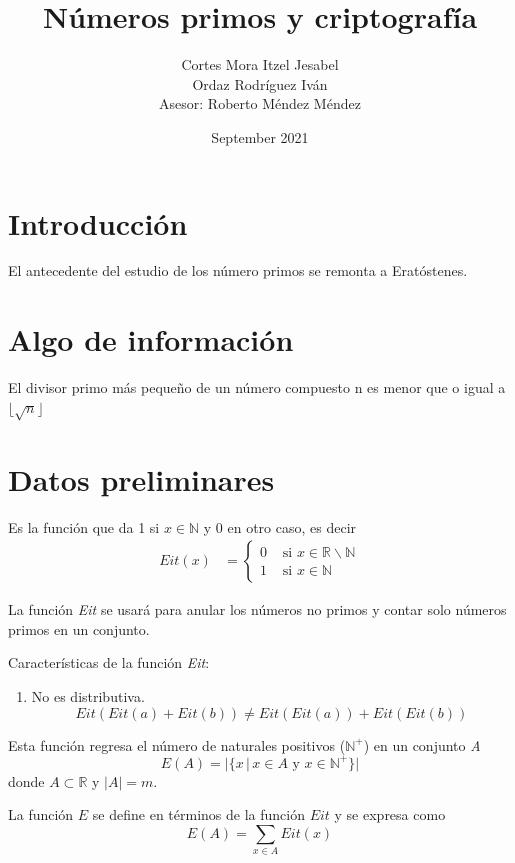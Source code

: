 \documentclass[10pt,letterpaper]{article}
\title{Números primos y criptografía}
\author{Cortes Mora Itzel Jesabel   \\Ordaz Rodríguez Iván \\ Asesor: Roberto Méndez Méndez}
\date{September 2021}
\begin{document}
	
	\maketitle
	\section*{Introducción}
	El antecedente del estudio de los número primos  se remonta a  Eratóstenes.
	
	
	
	\section{Algo de información}
	
	\begin{teoremaf2}
		El divisor primo más pequeño de un número compuesto n es menor que o igual a $\lfloor \sqrt{n} \rfloor$ 
		
	\end{teoremaf2}
	
	
	\section{Datos preliminares}
	\begin{definicionf2}
		Es la función que da 1 si $x \in \mathbb{N}$ y 0 en otro caso, es decir
		\begin{align}
			Eit(x)&=\begin{cases} 
				0 & \text{ si }x\in \mathbb{R}\backslash \mathbb{N}\\
				1 & \text{ si }x\in \mathbb{N}
			\end{cases} 
		\end{align}
	\end{definicionf2}
  La función \textit{Eit} se usará para anular los números no primos y contar solo números primos en un conjunto.


Características de la función \textit{Eit}:
\begin{enumerate}
	\item No es distributiva.
	\begin{equation*}
		Eit(Eit(a) + Eit(b)) \neq 	Eit(Eit(a)) + Eit(Eit(b)) 
	\end{equation*}
\end{enumerate}

\begin{definicionf2}
	Esta función regresa el número de naturales positivos ($\mathbb{N}^{+}$) en un conjunto \textit{A} 
	\begin{equation}
		E(A) = |\{ x \,|\, x \in A \text{ y } x \in \mathbb{N}^+ \}|
	\end{equation}
	donde $A \subset \mathbb{R}$ y $|A| = m$.
\end{definicionf2}
La función $E$ se define en términos de la función $Eit$ y se expresa como
\begin{equation}
	E(A) = \sum_{x \in A} \mathit{Eit}(x)
\end{equation}
\end{document}
